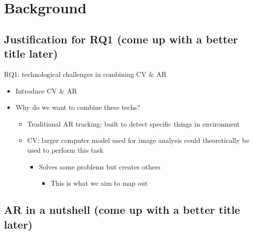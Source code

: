 \chapter{Background} \label{bg}

\section{Justification for RQ1 (come up with a better title later)} \label{rq1-justified}

RQ1: technological challenges in combining CV \& AR
\begin{itemize}
	\item{Introduce CV & AR}
	\item{Why do we want to combine these techs?}
	\begin{itemize}
		\item{Traditional AR tracking: built to detect specific things in environment}
		\item{CV: larger computer model used for image analysis could theoretically be used to perform this task}
		\begin{itemize}
			\item{Solves some problems but creates others}
			\begin{itemize}
				\item{This is what we aim to map out}
			\end{itemize}
		\end{itemize}
	\end{itemize}
\end{itemize}

\section{AR in a nutshell (come up with a better title later)} \label{ar}

